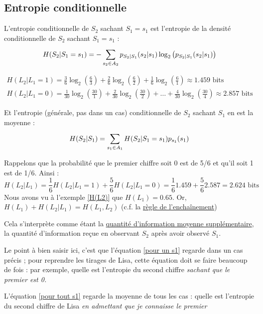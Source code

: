 \documentclass[11pt,a4paper]{article}
\renewcommand{\)}{\right)}
\renewcommand{\(}{\left(}
\begin{document}
\subsection{Entropie conditionnelle}
L'entropie conditionnelle de $S_2$ sachant $S_1 = s_1$ est l'entropie de la densité conditionnelle de $S_2$ sachant $S_1 = s_1$ :
\begin{equation}
	H(S_2|S_1 = s_1) = -\sum\limits_{s_2 \in A_2}^{} p_{S_2|S_1}(s_2|s_1)\log_2\big(p_{S_2|S_1}(s_2|s_1)\big) 
	\label{pour un s1}
\end{equation}
\begin{exemple}
	\begin{align*}
	H(L_2|L_1 = 1) = \frac{3}{6}\log_2\(\frac{6}{3}\) + \frac{2}{6}\log_2\(\frac{6}{2}\) + \frac{1}{6}\log_2\(\frac{6}{1}\) \approx 1.459 \text{ bits} \\
	H(L_2|L_1 = 0) = \frac{1}{30}\log_2\(\frac{30}{1}\) + \frac{2}{30}\log_2\(\frac{30}{2}\) + \ldots + \frac{4}{30}\log_2\(\frac{30}{4}\) \approx 2.857 \text{ bits}
	\end{align*}
\end{exemple}
Et l'entropie (générale, pas dans un cas) conditionnelle de $S_2$ sachant $S_1$ en est la moyenne :
\begin{equation}
	H(S_2|S_1) = \sum\limits_{s_1\in A_1}^{} H(S_2|S_1=s_1)p_{s_1}(s_1)
	\label{pour tout s1}
\end{equation}
\begin{exemple}
	Rappelons que la probabilité que le premier chiffre soit 0 est de 5/6 et qu'il soit 1 est de 1/6. Ainsi :
	\[H(L_2|L_1) = \frac{1}{6}H(L_2|L_1=1) + \frac{5}{6}H(L_2|L_1=0) = \frac{1}{6}1.459+ \frac{5}{6}2.587 = 2.624 \text{ bits}\]
	Nous avons vu à l'exemple \ref{H(L2)} que $H(L_1) = 0.65$. Or, $H(L_1) + H(L_2|L_1) = H(L_1,L_2)$ (c.f. la \hyperref[enchainement]{règle de l'enchaînement})
\end{exemple}
Cela s'interprète comme étant la \uline{quantité d'information moyenne supplémentaire}, la quantité d'information reçue en observant $S_2$ après avoir observé $S_1$.\\
\begin{exemple}
	Le point à bien saisir ici, c'est que l'équation \eqref{pour un s1} regarde dans un cas précis ; pour reprendre les tirages de Lisa, cette équation doit se faire beaucoup de fois : par exemple, quelle est l'entropie du second chiffre \textit{sachant que le premier est 0.}
	
	L'équation \eqref{pour tout s1} regarde la moyenne de tous les cas : quelle est l'entropie du second chiffre de Lisa \textit{en admettant que je connaisse le premier}
\end{exemple}
\end{document}
